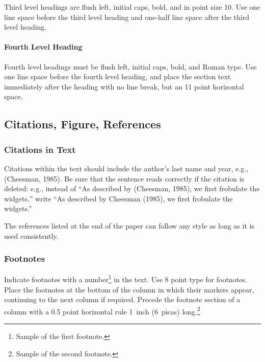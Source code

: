 \documentclass[twoside]{article}
\begin{document}
Third level headings are flush left, initial caps, bold, and in point
size 10. Use one line space before the third level heading and one-half line
space after the third level heading.

\paragraph{Fourth Level Heading}

Fourth level headings must be flush left, initial caps, bold, and
Roman type.  Use one line space before the fourth level heading, and
place the section text immediately after the heading with no line
break, but an 11 point horizontal space.

\subsection{Citations, Figure, References}


\subsubsection{Citations in Text}

Citations within the text should include the author's last name and
year, e.g., (Cheesman, 1985).
Be sure that the sentence reads
correctly if the citation is deleted: e.g., instead of ``As described
by (Cheesman, 1985), we first frobulate the widgets,'' write ``As
described by Cheesman (1985), we first frobulate the widgets.''


The references listed at the end of the paper can follow any style as long as it is used consistently.


\subsubsection{Footnotes}

Indicate footnotes with a number\footnote{Sample of the first
  footnote.} in the text. Use 8 point type for footnotes. Place the
footnotes at the bottom of the column in which their markers appear,
continuing to the next column if required. Precede the footnote
section of a column with a 0.5 point horizontal rule 1~inch (6~picas)
long.\footnote{Sample of the second footnote.}
\end{document}
